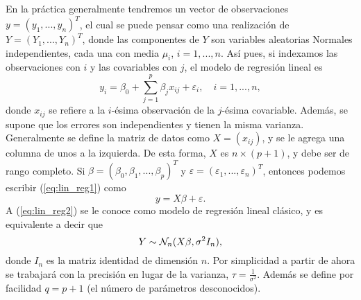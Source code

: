 En la práctica generalmente tendremos un vector de observaciones $y = (y_1, ..., y_n)^T$, el cual se puede pensar como una realización de $Y = (Y_1, ..., Y_n)^T$, donde las componentes de $Y$ son variables aleatorias Normales independientes, cada una con media $\mu_i$, $i=1, ..., n$. Así pues, si indexamos las observaciones con $i$ y las covariables con $j$, el modelo de regresión lineal es
\begin{equation} \label{eq:lin_reg1}
	y_i = \beta_0 + \sum_{j=1}^{p} \beta_j x_{ij} + \varepsilon_i, \quad i=1, ..., n,
\end{equation}
donde $x_{ij}$ se refiere a la $i$-ésima observación de la $j$-ésima covariable. Además, se supone que los errores son independientes y tienen la misma varianza. \\

Generalmente se define la matriz de datos como $X = (x_{ij})$, y se le agrega una columna de unos a la izquierda. De esta forma, $X$ es $n \times (p+1)$, y debe ser de rango completo. Si $\beta = (\beta_0, \beta_1, ..., \beta_p)^T$ y $\varepsilon = (\varepsilon_1, ..., \varepsilon_n)^T$, entonces podemos escribir (\ref{eq:lin_reg1}) como
\begin{equation} \label{eq:lin_reg2}
	y = X \beta + \varepsilon.
\end{equation}
A (\ref{eq:lin_reg2}) se le conoce como modelo de regresión lineal clásico, y es equivalente a decir que
\begin{equation}\label{eq:lin_reg3}
	Y \sim \mathcal{N}_n (X\beta, \sigma^2 I_n),
\end{equation}
donde $I_n$ es la matriz identidad de dimensión $n$. Por simplicidad a partir de ahora se trabajará con la precisión en lugar de la varianza, $\tau = \frac{1}{\sigma^2}$. Además se define por facilidad $q = p+1$ (el número de parámetros desconocidos). \\


